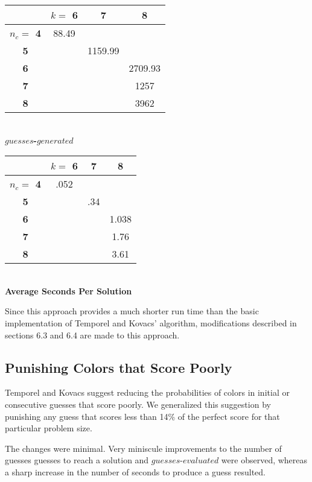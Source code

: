 \documentclass[11pt,twocolumn]{article}
\begin{document}
\begin{center}
\begin{tabular}{|c|c|c|c|}
\hline
        &\bf $k= $ 6 &\bf 7 &\bf 8 \\
\hline
\bf $n_c = $ 4 & 88.49   &   &   \\
\hline
\bf 5       &       & 1159.99&   \\
\hline
\bf 6       &       &   & 2709.93 \\
\hline
\bf 7       &       &   &1257 \\
\hline
\bf 8       &       &   &3962 \\
\hline
\end{tabular}\\
\bf $guesses$-$generated$ \rm
\end{center}



\begin{center}
\begin{tabular}{|c|c|c|c|}
\hline
        &\bf $k= $ 6 &\bf 7 &\bf 8 \\
\hline
\bf $n_c = $ 4 & .052   &   &   \\
\hline
\bf 5       &       &.34&   \\
\hline
\bf 6       &       &   &1.038 \\
\hline
\bf 7       &       &   &1.76 \\
\hline
\bf 8       &       &   &3.61 \\
\hline
\end{tabular}\\
\bf Average Seconds Per Solution  \rm
\end{center}

Since this approach provides a much shorter run time than the basic implementation of Temporel and Kovacs' algorithm, modifications described in sections 6.3 and 6.4 are made to this approach.

\subsection{Punishing Colors that Score Poorly}

Temporel and Kovacs suggest reducing the probabilities of colors in initial or consecutive guesses that score poorly. We generalized this suggestion by punishing any guess that scores less than 14\% of the perfect score for that particular problem size.

The changes were minimal. Very miniscule improvements to the number of guesses guesses to reach a solution and $guesses$-$evaluated$ were observed, whereas a sharp increase in the number of seconds to produce a guess resulted.
\end{document}
